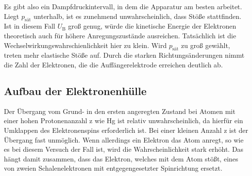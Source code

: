\noindent
Es gibt also ein Dampfdruckintervall, in dem die Apparatur am besten arbeitet.
Liegt $p_\text{sät}$ unterhalb, ist es zunehmend unwahrscheinlich, dass Stöße stattfinden.
Ist in diesem Fall $U_\text{B}$ groß genug, würde die kinetische Energie der Elektronen theoretisch auch für höhere Anregungszustände ausreichen.
Tatsächlich ist die Wechselwirkungswahrschienlichkeit hier zu klein.
Wird $p_\text{sät}$ zu groß gewählt, treten mehr elastische Stöße auf.
Durch die starken Richtungsänderungen nimmt die Zahl der Elektronen, die die Auffängerelektrode erreichen deutlich ab.


\subsection{Aufbau der Elektronenhülle}
Der Übergang vom Grund- in den ersten angeregten Zustand bei Atomen mit einer hohen Protonenanzahl z wie Hg ist relativ unwahrscheinlich,
da hierfür ein Umklappen des Elektronenspins erforderlich ist.
Bei einer kleinen Anzahl z ist der Übergang fast unmöglich.
Wenn allerdings ein Elektron das Atom anregt, so wie es bei diesem Versuch der Fall ist,
wird die Wahrscheinlichkeit stark erhöht.
Das hängt damit zusammen, dass das Elektron, welches mit dem Atom stößt, eines von zweien Schalenelektronen mit entgegengesetzter Spinrichtung ersetzt.